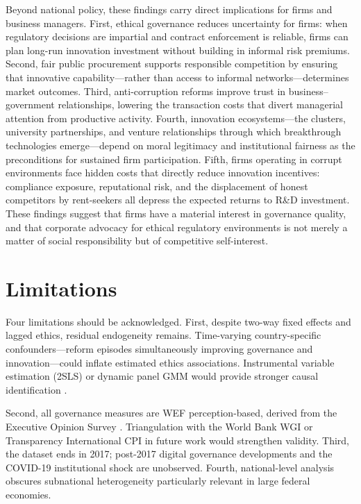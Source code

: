\documentclass[pdflatex,sn-apa]{sn-jnl}
\begin{document}
Beyond national policy, these findings carry direct implications for firms and business managers. First, ethical governance reduces uncertainty for firms: when regulatory decisions are impartial and contract enforcement is reliable, firms can plan long-run innovation investment without building in informal risk premiums. Second, fair public procurement supports responsible competition by ensuring that innovative capability---rather than access to informal networks---determines market outcomes. Third, anti-corruption reforms improve trust in business--government relationships, lowering the transaction costs that divert managerial attention from productive activity. Fourth, innovation ecosystems---the clusters, university partnerships, and venture relationships through which breakthrough technologies emerge---depend on moral legitimacy and institutional fairness as the preconditions for sustained firm participation. Fifth, firms operating in corrupt environments face hidden costs that directly reduce innovation incentives: compliance exposure, reputational risk, and the displacement of honest competitors by rent-seekers all depress the expected returns to R\&D investment. These findings suggest that firms have a material interest in governance quality, and that corporate advocacy for ethical regulatory environments is not merely a matter of social responsibility but of competitive self-interest.

\section{Limitations}
\label{sec:limitations}

Four limitations should be acknowledged. First, despite two-way fixed effects \citep{baltagi2005,wooldridge2010,hsiao2014} and lagged ethics, residual endogeneity remains. Time-varying country-specific confounders---reform episodes simultaneously improving governance and innovation---could inflate estimated ethics associations. Instrumental variable estimation (2SLS) or dynamic panel GMM would provide stronger causal identification \citep{wooldridge2010}.

Second, all governance measures are WEF perception-based, derived from the Executive Opinion Survey \citep{wef2017}. Triangulation with the World Bank WGI \citep{worldbank2017} or Transparency International CPI \citep{transparency2017} in future work would strengthen validity. Third, the dataset ends in 2017; post-2017 digital governance developments and the COVID-19 institutional shock are unobserved. Fourth, national-level analysis obscures subnational heterogeneity particularly relevant in large federal economies.
\end{document}
